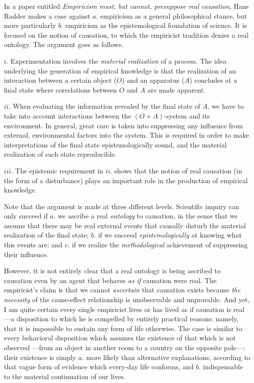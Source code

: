 \documentclass[a4paper]{article}
\begin{document}
In a paper entitled \textit{Empiricism must, but cannot, presuppose real
causation}, Hans Radder makes a case against $a.$ empiricism as a general
philosophical stance, but more particularly $b.$ empiricism as the
epistemological foundation of science. It is focused on the notion of causation,
to which the empiricist tradition denies a real ontology. The argument goes as
follows.

$i.$ Experimentation involves the \textit{material realization} of a process.
The idea underlying the generation of empirical knowledge is that the
realization of an interaction between a certain object ($O$) and an apparatus
($A$) concludes at a final state where correlations between $O$ and $A$ are made
apparent.

$ii.$ When evaluating the information revealed by the final state of $A$, we have to
take into account interactions between the $( O+A )$-system and its environment.
In general, great care is taken into suppressing any influence from external,
environmental factors into the system. This is required in order to make
interpretations of the final state epistemologically sound, and the material
realization of such state reproducible.

$iii.$ The epistemic requirement in $ii.$ shows that the notion of real
causation (in the form of a disturbance) plays an important role in the
production of empirical knowledge.

Note that the argument is made at three different levels. Scientific inquiry can
only succeed if $a.$ we ascribe a real \textit{ontology} to causation, in the
sense that we assume that there may be real external events that causally
disturb the material realization of the final state; $b.$ if we succeed
\textit{epistemologically} at knowing what this events are; and $c.$ if we
realize the \textit{methodological} achievement of suppressing their influence.

However, it is not entirely clear that a real ontology is being ascribed to
causation even by an agent that behaves \textit{as if} causation were real. The
empiricist's claim is that we cannot \textit{ascertain} that causation exists
because \textit{the necessity} of the cause-effect relationship is unobservable
and unprovable. And yet, I am quite certain every single empiricist lives or has
lived as if causation is real ---a disposition to which he is compelled by
entirely practical reasons: namely, that it is impossible to sustain any form of
life otherwise. The case is similar to every behavioral disposition which
assumes the existence of that which is not observed ---from an object in another
room to a country on the opposite pole---: their existence is simply $a.$ more
likely than alternative explanations, according to that vague form of
evidence which every-day life conforms, and $b.$ indispensable to the material
continuation of our lives.
\end{document}
